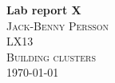 \documentclass[11pt,a4paper]{article}
\begin{document}
\begin{titlepage}
\begin{center}
\vspace*{3.5 cm}

{ \huge \bfseries Lab report X}\\[0.4cm]
\textsc{\Large Jack-Benny Persson}\\[0.5cm]
\textsc{\Large LX13}\\[0.5cm]
\textsc{\Large Building clusters}\\[0.5cm]
\textsc{\Large \today}\\[0.5cm]


\end{center}
\end{titlepage}

\pagebreak
\tableofcontents
\pagebreak



\end{document}
